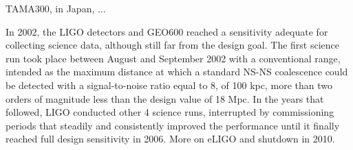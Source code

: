 
TAMA300, in Japan, ...

In 2002, the LIGO detectors and GEO600 reached a sensitivity adequate for collecting science data, although still far from the design goal.
The first science run took place between August and September 2002 with a conventional range, intended as the maximum distance at which a standard NS-NS coalescence could be detected with a signal-to-noise ratio equal to 8, of 100 kpc, more than two orders of magnitude less than the design value of 18 Mpc.
In the years that followed, LIGO conducted other 4 science runs, interrupted by commissioning periods that steadily and consistently improved the performance until it finally reached full design sensitivity in 2006.
More on eLIGO and shutdown in 2010.



